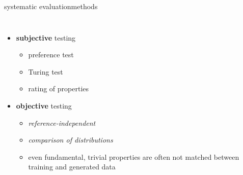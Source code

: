 \begin{frame}{systematic evaluation}{methods}
    \vspace{-5mm}
    
    \begin{columns}
    \begin{itemize}
 
        \item<1->   \textbf{subjective} testing
            \begin{itemize}
                \item<2->   preference test
                \item<2->   Turing test
                \item<2->   rating of properties
            \end{itemize}
        \bigskip
        \item<3->   \textbf{objective} testing
            \begin{itemize}
                \item   \textit{reference-independent} 
                \item   \textit{comparison of distributions}
                \smallskip
                \item<4->[$\Rightarrow$] even fundamental, trivial properties are often not matched between training and generated data
            \end{itemize}
    \end{itemize}
    \end{columns}
\end{frame}

